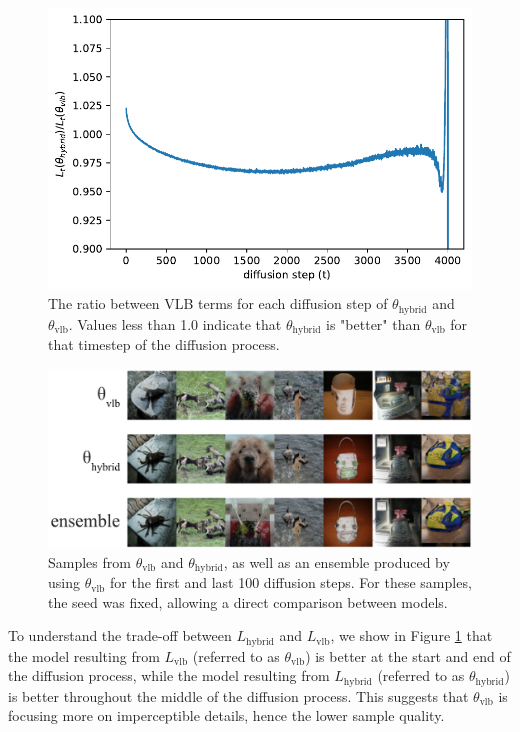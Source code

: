 \documentclass{article}
\begin{document}
\begin{figure}[ht]
    \centerline{\includegraphics[width=\columnwidth]{bpd_terms-eps.pdf}}
    \caption{\label{fig:bpdterms} The ratio between VLB terms for each diffusion step of $\theta_{\text{hybrid}}$ and $\theta_{\text{vlb}}$. Values less than 1.0 indicate that $\theta_{\text{hybrid}}$ is "better" than $\theta_{\text{vlb}}$ for that timestep of the diffusion process.}
\end{figure}

\begin{figure}[ht]
    \centering
    \includegraphics[width=\columnwidth]{comparison_samples.png}
    \caption{\label{fig:objectivesamples} Samples from $\theta_{\text{vlb}}$ and $\theta_{\text{hybrid}}$, as well as an ensemble produced by using $\theta_{\text{vlb}}$ for the first and last 100 diffusion steps. For these samples, the seed was fixed, allowing a direct comparison between models.} 
\end{figure}

To understand the trade-off between $L_{\text{hybrid}}$ and $L_{\text{vlb}}$, we show in Figure \ref{fig:bpdterms} that the model resulting from $L_{\text{vlb}}$ (referred to as $\theta_{\text{vlb}}$) is better at the start and end of the diffusion process, while the model resulting from $L_{\text{hybrid}}$ (referred to as $\theta_{\text{hybrid}}$) is better throughout the middle of the diffusion process. This suggests that $\theta_{\text{vlb}}$ is focusing more on imperceptible details, hence the lower sample quality.
\end{document}
